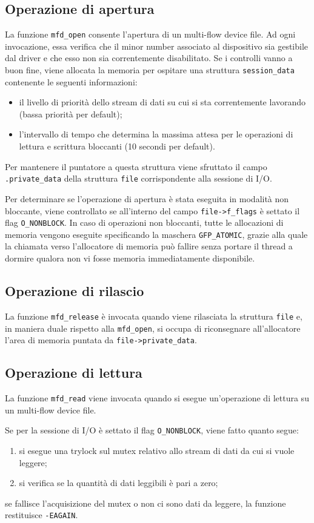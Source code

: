 \documentclass{article}
\begin{document}
\subsection{Operazione di apertura}
La funzione \texttt{mfd\_open} consente l'apertura di un multi-flow device file. Ad ogni invocazione, essa verifica che il minor number associato al dispositivo sia gestibile dal driver e che esso non sia correntemente disabilitato. Se i controlli vanno a buon fine, viene allocata la memoria per ospitare una struttura \texttt{session\_data} contenente le seguenti informazioni:
\begin{itemize}
\item il livello di priorità dello stream di dati su cui si sta correntemente lavorando (bassa priorità per default);
\item l'intervallo di tempo che determina la massima attesa per le operazioni di lettura e scrittura bloccanti (10 secondi per default).
\end{itemize}
Per mantenere il puntatore a questa struttura viene sfruttato il campo \texttt{.private\_data} della struttura \texttt{file} corrispondente alla sessione di I/O.

Per determinare se l'operazione di apertura è stata eseguita in modalità non bloccante, viene controllato se all'interno del campo \texttt{file->f\_flags} è settato il flag \texttt{O\_NONBLOCK}. In caso di operazioni non bloccanti, tutte le allocazioni di memoria vengono eseguite specificando la maschera \texttt{GFP\_ATOMIC}, grazie alla quale la chiamata verso l'allocatore di memoria può fallire senza portare il thread a dormire qualora non vi fosse memoria immediatamente disponibile.

\subsection{Operazione di rilascio}
La funzione \texttt{mfd\_release} è invocata quando viene rilasciata la struttura \texttt{file} e, in maniera duale rispetto alla \texttt{mfd\_open}, si occupa di riconsegnare all'allocatore l'area di memoria puntata da \texttt{file->private\_data}.

\subsection{Operazione di lettura}
La funzione \texttt{mfd\_read} viene invocata quando si esegue un'operazione di lettura su un multi-flow device file.

Se per la sessione di I/O è settato il flag \texttt{O\_NONBLOCK}, viene fatto quanto segue:
\begin{enumerate}
\item si esegue una trylock sul mutex relativo allo stream di dati da cui si vuole leggere;
\item si verifica se la quantità di dati leggibili è pari a zero;
\end{enumerate}
se fallisce l'acquisizione del mutex o non ci sono dati da leggere, la funzione restituisce \texttt{-EAGAIN}.
\end{document}
